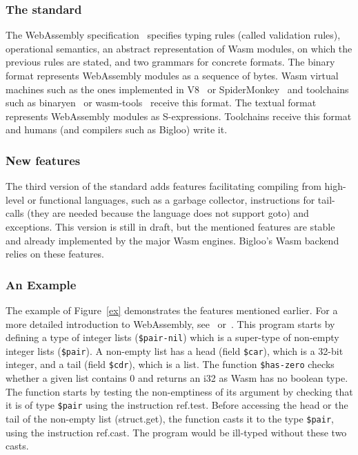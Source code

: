 \documentclass[a4paper,11pt]{article}
\begin{document}
\subsubsection{The standard}
The WebAssembly specification~\cite{WebAssemblyCoreSpecification3} specifies
typing rules (called validation rules), operational semantics, an abstract
representation of Wasm modules, on which the previous rules are stated, and two
grammars for concrete formats. The binary format represents WebAssembly modules
as a sequence of bytes. Wasm virtual machines such as the ones implemented in
V8~\cite{V8} or SpiderMonkey~\cite{SpiderMonkey} and toolchains such as
binaryen~\cite{Binaryen} or wasm-tools~\cite{WasmTools} receive this format. The
textual format represents WebAssembly modules as S-expressions. Toolchains
receive this format and humans (and compilers such as Bigloo) write it.

\subsubsection{New features}
The third version of the standard adds features facilitating compiling from
high-level or functional languages, such as a garbage collector, instructions
for tail-calls (they are needed because the language does not support goto) and
exceptions. This version is still in draft, but the mentioned features are
stable and already implemented by the major Wasm engines. Bigloo's Wasm backend
relies on these features.

\subsubsection{An Example}
The example of Figure~\ref{ex} demonstrates the features mentioned earlier. For
a more detailed introduction to WebAssembly,
see~\cite[Section~2.1]{phipps2023continuing} or~\cite{haas2017bringing}. This
program starts by defining a type of integer lists (\texttt{\$pair-nil}) which
is a super-type of non-empty integer lists (\texttt{\$pair}). A non-empty list
has a head (field \texttt{\$car}), which is a 32-bit integer, and a tail (field
\texttt{\$cdr}), which is a list. The function \texttt{\$has-zero} checks
whether a given list contains 0 and returns an \textsf{i32} as Wasm has no
boolean type. The function starts by testing the non-emptiness of its argument
by checking that it is of type \texttt{\$pair} using the instruction
\textsf{ref.test}. Before accessing the head or the tail of the non-empty list
(\textsf{struct.get}), the function casts it to the type \texttt{\$pair}, using
the instruction \textsf{ref.cast}. The program would be ill-typed without these
two casts.
\end{document}

